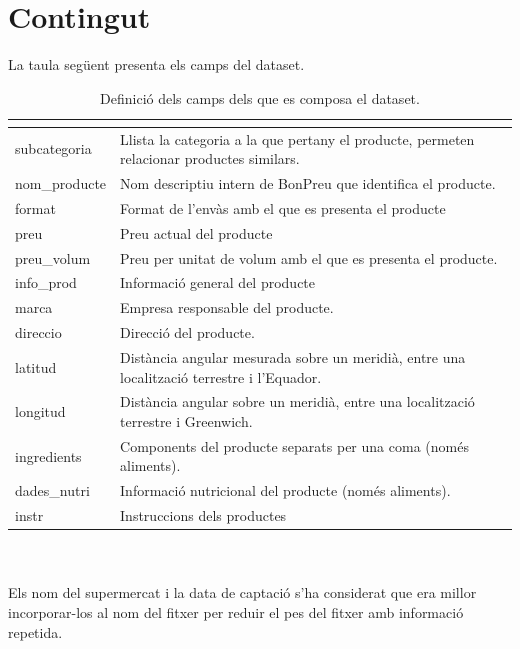 \documentclass[]{scrartcl}
\begin{document}
\section{Contingut}
La taula següent presenta els camps del dataset.
\begin{table}[htbp]
	\centering
	\resizebox{17cm}{!} {
	\begin{tabular}{|l|l|}
		\hline
		\rowcolor[HTML]{000078} 
		\multicolumn{1}{|c|}{\cellcolor[HTML]{000078}{\color[HTML]{FFFFFF} \textbf{Camp}}} &
		\multicolumn{1}{c|}{\cellcolor[HTML]{000078}{\color[HTML]{FFFFFF} \textbf{Descripció}}} \\ \hline
		subcategoria       & Llista la categoria a la que pertany el producte, permeten relacionar productes similars. \\ \hline
		nom\_producte & Nom descriptiu intern de BonPreu que identifica el producte. \\ \hline
		format  & Format de l'envàs amb el que es presenta el producte \\ \hline
		preu       & Preu actual del producte \\ \hline
		preu\_volum & Preu per unitat de volum amb el que es presenta el producte. \\ \hline
		info\_prod  & Informació general del producte \\ \hline
		marca  & Empresa responsable del producte. \\ \hline
		direccio       & Direcció del producte. \\ \hline
		latitud & Distància angular mesurada sobre un meridià, entre una localització terrestre i l'Equador. \\ \hline
		longitud  &  Distància angular sobre un meridià, entre una localització terrestre i Greenwich.\\ \hline
		ingredients       & Components del producte separats per una coma (només aliments). \\ \hline
		dades\_nutri & Informació nutricional del producte (només aliments). \\ \hline
		instr  & Instruccions dels productes \\ \hline
	\end{tabular}
	}
	\caption{Definició dels camps dels que es composa el dataset.}
	\label{tab:Taula de contribucions}
\end{table}
\\\\Els nom del supermercat i la data de captació s'ha considerat que era millor incorporar-los al nom del fitxer per reduir el pes del fitxer amb informació repetida.
\end{document}
